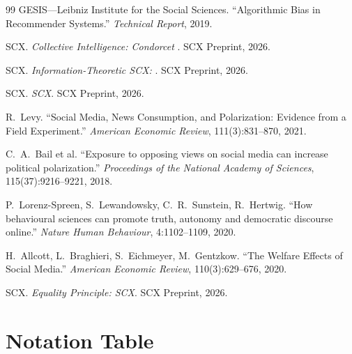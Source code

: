 \documentclass[11pt,a4paper]{article}
\theoremstyle{remark}
\begin{document}
\begin{thebibliography}{99}
GESIS---Leibniz Institute for the Social Sciences. ``Algorithmic Bias in Recommender Systems.''
\emph{Technical Report}, 2019.

SCX. \emph{Collective Intelligence: Condorcet }. SCX Preprint, 2026.

SCX. \emph{Information-Theoretic SCX: }. SCX Preprint, 2026.

SCX. \emph{SCX}. SCX Preprint, 2026.

R.~Levy. ``Social Media, News Consumption, and Polarization: Evidence from a Field Experiment.''
\emph{American Economic Review}, 111(3):831--870, 2021.

C.~A.~Bail et al. ``Exposure to opposing views on social media can increase political polarization.''
\emph{Proceedings of the National Academy of Sciences}, 115(37):9216--9221, 2018.

P.~Lorenz-Spreen, S.~Lewandowsky, C.~R.~Sunstein, R.~Hertwig.
``How behavioural sciences can promote truth, autonomy and democratic discourse online.''
\emph{Nature Human Behaviour}, 4:1102--1109, 2020.

H.~Allcott, L.~Braghieri, S.~Eichmeyer, M.~Gentzkow. ``The Welfare Effects of Social Media.''
\emph{American Economic Review}, 110(3):629--676, 2020.

SCX. \emph{Equality Principle: SCX}. SCX Preprint, 2026.

\end{thebibliography}

\appendix
\section{ Notation Table}
\end{document}
